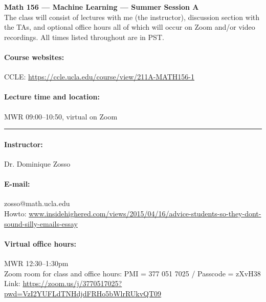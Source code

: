 \documentclass[11pt,letter]{article}
\begin{document}
{\Large{\textbf{Math 156 ---  Machine Learning --- Summer Session A}}} \\

The class will consist of lectures with me (the instructor), discussion section with the TAs, and optional office hours all of which will occur
on Zoom and/or video recordings. All times listed throughout are in PST.



\paragraph{Course websites:} CCLE: \url{https://ccle.ucla.edu/course/view/211A-MATH156-1}%

\paragraph{Lecture time and location:} MWR 09:00--10:50, virtual on Zoom\phantom{p}\hrule
\paragraph{Instructor:}  Dr. Dominique Zosso
\paragraph{E-mail:} zosso@math.ucla.edu\\
{\footnotesize Howto: \url{www.insidehighered.com/views/2015/04/16/advice-students-so-they-dont-sound-silly-emails-essay}}
\paragraph{Virtual office hours:} MWR 12:30--1:30pm\\
Zoom room for class and office hours: PMI = 377 051 7025 / Passcode = zXvH38\\
Link: \url{https://zoom.us/j/3770517025?pwd=VzI2YUFLdTNHdjdFRHo5bWlrRUkvQT09}
\end{document}
